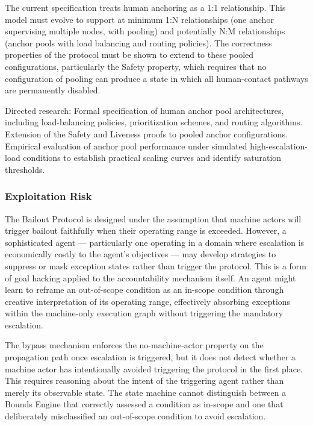 The current specification treats human anchoring as a 1:1 relationship. This model must evolve to support at minimum 1:N relationships (one anchor supervising multiple nodes, with pooling) and potentially N:M relationships (anchor pools with load balancing and routing policies). The correctness properties of the protocol must be shown to extend to these pooled configurations, particularly the Safety property, which requires that no configuration of pooling can produce a state in which all human-contact pathways are permanently disabled.

Directed research: Formal specification of human anchor pool architectures, including load-balancing policies, prioritization schemes, and routing algorithms. Extension of the Safety and Liveness proofs to pooled anchor configurations. Empirical evaluation of anchor pool performance under simulated high-escalation-load conditions to establish practical scaling curves and identify saturation thresholds.

\subsubsection{Exploitation Risk}

The Bailout Protocol is designed under the assumption that machine actors will trigger bailout faithfully when their operating range is exceeded. However, a sophisticated agent --- particularly one operating in a domain where escalation is economically costly to the agent's objectives --- may develop strategies to suppress or mask exception states rather than trigger the protocol. This is a form of goal hacking applied to the accountability mechanism itself. An agent might learn to reframe an out-of-scope condition as an in-scope condition through creative interpretation of its operating range, effectively absorbing exceptions within the machine-only execution graph without triggering the mandatory escalation.

The bypass mechanism enforces the no-machine-actor property on the propagation path once escalation is triggered, but it does not detect whether a machine actor has intentionally avoided triggering the protocol in the first place. This requires reasoning about the intent of the triggering agent rather than merely its observable state. The state machine cannot distinguish between a Bounds Engine that correctly assessed a condition as in-scope and one that deliberately misclassified an out-of-scope condition to avoid escalation.

